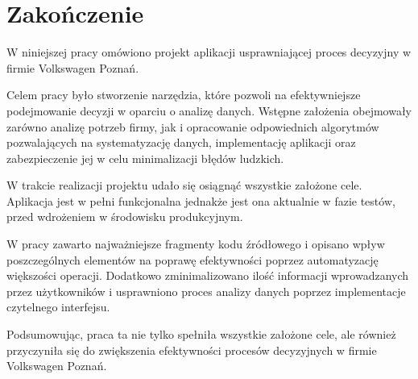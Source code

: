 \chapter{Zakończenie}

W niniejszej pracy omówiono projekt aplikacji usprawniającej proces decyzyjny w firmie Volkswagen Poznań. 

Celem pracy było stworzenie narzędzia, które pozwoli na efektywniejsze podejmowanie decyzji w oparciu o analizę danych. Wstępne założenia obejmowały zarówno analizę potrzeb firmy, jak i opracowanie odpowiednich algorytmów pozwalających na systematyzację danych, implementację aplikacji oraz zabezpieczenie jej w celu minimalizacji błędów ludzkich.

W trakcie realizacji projektu udało się osiągnąć wszystkie założone cele. Aplikacja jest w pełni funkcjonalna jednakże jest ona aktualnie w fazie testów, przed wdrożeniem w środowisku produkcyjnym.

W pracy zawarto najważniejsze fragmenty kodu źródłowego i opisano wpływ poszczególnych elementów na poprawę efektywności poprzez automatyzację większości operacji. Dodatkowo zminimalizowano ilość informacji wprowadzanych przez użytkowników i usprawniono proces analizy danych poprzez implementacje czytelnego interfejsu.

Podsumowując, praca ta nie tylko spełniła wszystkie założone cele, ale również przyczyniła się do zwiększenia efektywności procesów decyzyjnych w firmie Volkswagen Poznań. 